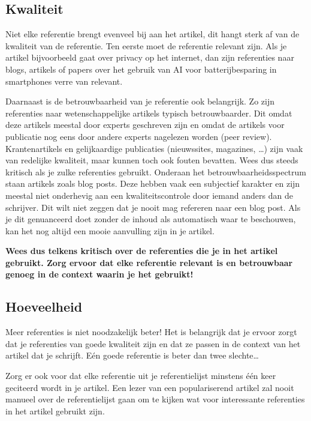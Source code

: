 \documentclass[a4paper]{article}
\begin{document}
\subsection{Kwaliteit}

Niet elke referentie brengt evenveel bij aan het artikel, dit hangt sterk af van de kwaliteit van de referentie.
Ten eerste moet de referentie relevant zijn.
Als je artikel bijvoorbeeld gaat over privacy op het internet, dan zijn referenties naar blogs, artikels of papers over het gebruik van AI voor batterijbesparing in smartphones verre van relevant.

Daarnaast is de betrouwbaarheid van je referentie ook belangrijk.
Zo zijn referenties naar wetenschappelijke artikels typisch betrouwbaarder.
Dit omdat deze artikels meestal door experts geschreven zijn en omdat de artikels voor publicatie nog eens door andere experts nagelezen worden (peer review).
Krantenartikels en gelijkaardige publicaties (nieuwssites, magazines, \ldots) zijn vaak van redelijke kwaliteit, maar kunnen toch ook fouten bevatten.
Wees dus steeds kritisch als je zulke referenties gebruikt.
Onderaan het betrouwbaarheidsspectrum staan artikels zoals blog posts.
Deze hebben vaak een subjectief karakter en zijn meestal niet onderhevig aan een kwaliteitscontrole door iemand anders dan de schrijver.
Dit wilt niet zeggen dat je nooit mag refereren naar een blog post.
Als je dit genuanceerd doet zonder de inhoud als automatisch waar te beschouwen, kan het nog altijd een mooie aanvulling zijn in je artikel.

\textbf{Wees dus telkens kritisch over de referenties die je in het artikel gebruikt. Zorg ervoor dat elke referentie relevant is en betrouwbaar genoeg in de context waarin je het gebruikt!}


\subsection{Hoeveelheid}

Meer referenties is niet noodzakelijk beter!
Het is belangrijk dat je ervoor zorgt dat je referenties van goede kwaliteit zijn en dat ze passen in de context van het artikel dat je schrijft.
E\'en goede referentie is beter dan twee slechte\ldots{}

Zorg er ook voor dat elke referentie uit je referentielijst minstens \'e\'en keer geciteerd wordt in je artikel.
Een lezer van een populariserend artikel zal nooit manueel over de referentielijst gaan om te kijken wat voor interessante referenties in het artikel gebruikt zijn.
\end{document}
